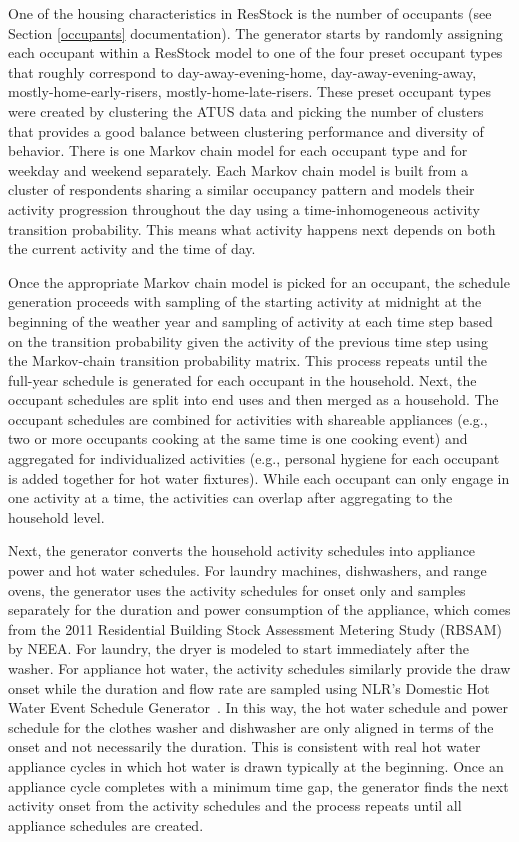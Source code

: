 One of the housing characteristics in ResStock is the number of occupants (see Section \ref{occupants} documentation). The generator starts by randomly assigning each occupant within a ResStock model to one of the four preset occupant types that roughly correspond to day-away-evening-home, day-away-evening-away, mostly-home-early-risers, mostly-home-late-risers. These preset occupant types were created by clustering the ATUS data and picking the number of clusters that provides a good balance between clustering performance and diversity of behavior. There is one Markov chain model for each occupant type and for weekday and weekend separately. Each Markov chain model is built from a cluster of respondents sharing a similar occupancy pattern and models their activity progression throughout the day using a time-inhomogeneous activity transition probability. This means what activity happens next depends on both the current activity and the time of day.

Once the appropriate Markov chain model is picked for an occupant, the schedule generation proceeds with sampling of the starting activity at midnight at the beginning of the weather year and sampling of activity at each time step based on the transition probability given the activity of the previous time step using the Markov-chain transition probability matrix. This process repeats until the full-year schedule is generated for each occupant in the household. Next, the occupant schedules are split into end uses and then merged as a household. The occupant schedules are combined for activities with shareable appliances (e.g., two or more occupants cooking at the same time is one cooking event) and aggregated for individualized activities (e.g., personal hygiene for each occupant is added together for hot water fixtures). While each occupant can only engage in one activity at a time, the activities can overlap after aggregating to the household level.

Next, the generator converts the household activity schedules into appliance power and hot water schedules. For laundry machines, dishwashers, and range ovens, the generator uses the activity schedules for onset only and samples separately for the duration and power consumption of the appliance, which comes from the 2011 Residential Building Stock Assessment Metering Study (RBSAM) by NEEA. For laundry, the dryer is modeled to start immediately after the washer. For appliance hot water, the activity schedules similarly provide the draw onset while the duration and flow rate are sampled using NLR's Domestic Hot Water Event Schedule Generator~\citep{Hendron2010}. In this way, the hot water schedule and power schedule for the clothes washer and dishwasher are only aligned in terms of the onset and not necessarily the duration. This is consistent with real hot water appliance cycles in which hot water is drawn typically at the beginning. Once an appliance cycle completes with a minimum time gap, the generator finds the next activity onset from the activity schedules and the process repeats until all appliance schedules are created.

